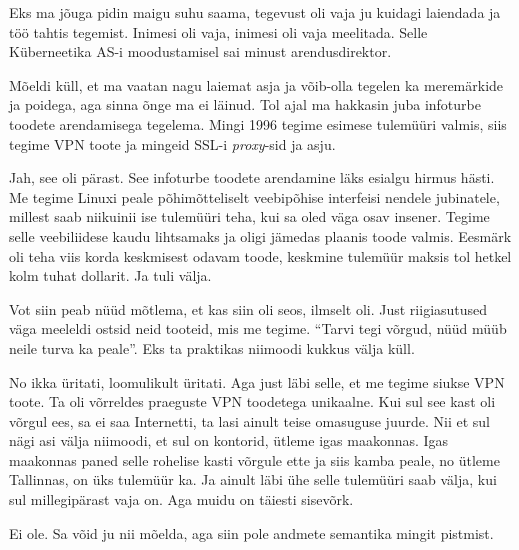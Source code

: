 Eks ma jõuga pidin maigu suhu saama, tegevust oli vaja ju kuidagi laiendada ja 
töö tahtis tegemist.  Inimesi oli vaja, inimesi oli vaja meelitada. Selle 
Küberneetika AS-i  moodustamisel sai minust 
arendusdirektor. 

Mõeldi küll, et ma vaatan nagu laiemat asja ja võib-olla tegelen ka meremärkide 
ja poidega, aga sinna õnge ma ei läinud. Tol ajal ma hakkasin juba infoturbe 
toodete arendamisega tegelema. Mingi 1996 tegime esimese tulemüüri valmis, siis 
tegime  VPN toote ja mingeid SSL-i \emph{proxy}-sid ja asju. 


Jah, see oli pärast. See infoturbe toodete arendamine läks esialgu hirmus 
hästi. Me tegime Linuxi peale põhimõtteliselt veebipõhise interfeisi nendele 
jubinatele, millest saab niikuinii ise tulemüüri teha, kui sa oled väga osav 
insener. Tegime selle veebiliidese kaudu lihtsamaks ja oligi jämedas plaanis 
toode valmis. Eesmärk oli teha viis korda keskmisest odavam toode, keskmine 
tulemüür  maksis  tol hetkel kolm tuhat dollarit. Ja tuli välja. 

Vot siin peab nüüd mõtlema, et kas siin oli seos, ilmselt oli. Just 
riigiasutused väga meeleldi ostsid neid tooteid, mis me tegime. \enquote{Tarvi 
tegi võrgud, nüüd müüb neile turva ka peale}. Eks ta praktikas niimoodi kukkus 
välja küll. 


No ikka üritati, loomulikult üritati. Aga just läbi selle, et me tegime siukse 
VPN toote. Ta oli võrreldes praeguste VPN toodetega unikaalne. Kui sul see kast 
oli võrgul ees, sa ei saa Internetti,  ta lasi ainult teise omasuguse juurde. 
Nii et sul nägi asi välja niimoodi, et sul on kontorid, ütleme igas maakonnas.  
Igas maakonnas paned selle rohelise kasti võrgule ette ja siis kamba peale, no 
ütleme Tallinnas,  on üks tulemüür ka. Ja ainult  läbi ühe selle tulemüüri saab 
välja, kui sul millegipärast vaja on. Aga muidu on täiesti sisevõrk. 


Ei ole. Sa võid ju nii mõelda, aga siin pole andmete semantika mingit pistmist. 


